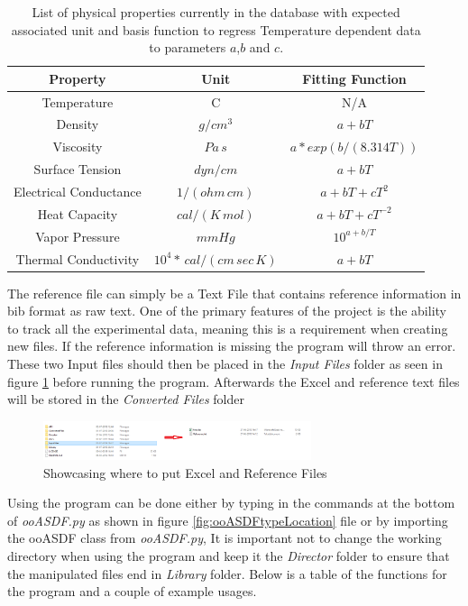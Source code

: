\begin{table}[h]
    \centering
    \caption{List of physical properties currently in the database with expected associated unit and basis function to regress Temperature dependent data to parameters $a$,$b$ and $c$.}
    \begin{tabular}{c|c|c}
    \hline
    Property     & Unit & Fitting Function  \\ \hline
    Temperature     & \textdegree{}C  & N/A\\
    Density & $g/cm^3$ & $a+bT$\\ 
    Viscosity & $Pa \, s$ & $a*exp(b/(8.314T))$\\
    Surface Tension & $dyn/cm$ & $a+bT$\\
    Electrical Conductance & $1/(ohm\, cm)$ & $a + bT + cT^2$ \\
    Heat Capacity & $cal/(K\,mol)$ & $a + bT + cT^{-2}$ \\
    Vapor Pressure & $mmHg$ & $10^{a + b/T}$ \\
    Thermal Conductivity & $10^4* \, cal/(cm\,sec\,K)$ & $a + bT$\\
    \hline
    \end{tabular}
    \label{tab:unitStandards}
\end{table}

The reference file can simply be a Text File that contains reference information in bib format as raw text. One of the primary features of the project is the ability to track all the experimental data, meaning this is a requirement when creating new files. If the reference information is missing the program will throw an error.
 These two Input files should then be placed in the \textit{Input Files} folder as seen in figure \ref{fig:inputStruct} before running the program. Afterwards the Excel and reference text files will be stored in the \textit{Converted Files} folder\\

\begin{figure}[h]
    \centering
    \includegraphics[width = 0.7\textwidth]{msdf/figures/input.png}
    \caption{Showcasing where to put Excel and Reference Files}
    \label{fig:inputStruct}
\end{figure}

Using the program can be done either by typing in the commands at the bottom of \textit{ooASDF.py} as shown in figure \ref{fig:ooASDFtypeLocation} file or by importing the ooASDF class from \textit{ooASDF.py}, It is important not to change the working directory when using the program and keep it the \textit{Director} folder to ensure that the manipulated files end in \textit{Library} folder. Below is a table of the functions for the program and a couple of example usages.

